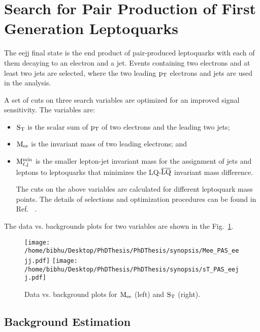 \newpage
\section{Search for Pair Production of First Generation Leptoquarks}

The eejj final state is the end product of pair-produced leptoquarks with each of them decaying to an electron and a jet. Events containing  two electrons and at least two jets are selected, where the two leading $\rm p_{T}$ electrons and jets are used in the analysis.

A set  of cuts on three search variables are optimized for an improved signal sensitivity. The variables are:



\begin{itemize}
\item $\rm S_{T}$ is the scalar sum of $\rm p_{T}$ of two electrons and the leading two jets;

\item $\rm M_{ee}$ is the invariant mass of two leading electrons; and

\item $\rm M_{\ell ,j}^{min}$ is the smaller lepton-jet invariant mass for the assignment of jets and leptons to leptoquarks that minimizes the LQ-$\rm \overline{LQ}$ invariant mass difference.


The cuts on the above variables are calculated for different leptoquark mass points. The details of selections and optimization procedures can be found  in Ref. ~\cite{CMS-PAS-EXO-16-043}.



\end{itemize}

The data vs. backgrounds plots for two variables are shown in the Fig.~\ref{figure:DataVsMCinVariableLQ1}.
\begin{figure}[h]
\centering
\texttt{[image: /home/bibhu/Desktop/PhDThesis/PhDThesis/synopsis/Mee\_PAS\_eejj.pdf]}
\texttt{[image: /home/bibhu/Desktop/PhDThesis/PhDThesis/synopsis/sT\_PAS\_eejj.pdf]}
\caption{\label{figure:DataVsMCinVariableLQ1}Data vs. background plots for $\rm M_{ee}$ (left) and $\rm S_{T}$ (right). }
\end{figure}


\subsection{Background Estimation}

